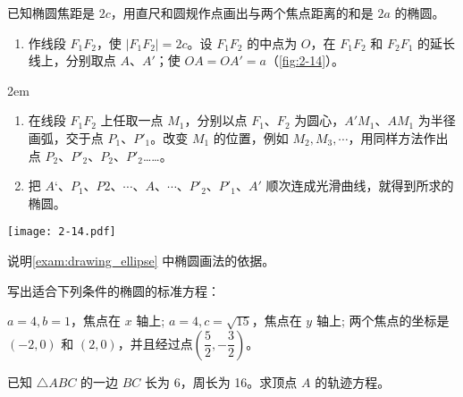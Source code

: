 \begin{example}\label{exam:drawing_ellipse}
  已知椭圆焦距是 $2c$，用直尺和圆规作点画出与两个焦点距离的和是 $2a$ 的椭圆。
\end{example}
\begin{solution}
  \begin{enumerate}
    \item 作线段 $F_1F_2$，使 $|F_1F_2|=2c$。设 $F_1F_2$ 的中点为 $O$，在 $F_1F_2$ 和 $F_2F_1$ 的延长线上，分别取点 $A$、$A'$；使 $OA=OA'=a$（\cref{fig:2-14}）。
  \end{enumerate}

  \medskip\noindent
  \begin{minipage}{0.6\linewidth}\parindent2em
  \begin{enumerate}[resume]
    \item 在线段 $F_1F_2$ 上任取一点 $M_1$，分别以点 $F_1$、$F_2$ 为圆心，$A'M_1$、$AM_1$ 为半径画弧，交于点 $P_1$、$P'_1$。改变 $M_1$ 的位置，例如 $M_2,M_3,\cdots$，用同样方法作出点 $P_2$、$P'_2$、$P_2$、$P'_2$……。
    \item 把 $A‘$、$P_1$、$P2$、$\cdots$、$A$、$\cdots$、$P'_2$、$P'_1$、$A'$ 顺次连成光滑曲线，就得到所求的椭圆。
  \end{enumerate}
\end{minipage}\hfill
  \begin{minipage}{0.35\linewidth}\centering
    \begin{figurehere}
      \texttt{[image: 2-14.pdf]}
      \caption{}\label{fig:2-14}
    \end{figurehere}
  \end{minipage}

\end{solution}
\begin{Practice}
  \begin{question}
    \item 说明\cref{exam:drawing_ellipse} 中椭圆画法的依据。
    \item 写出适合下列条件的椭圆的标准方程：
    \begin{tasks}
      \task $a=4,b=1$，焦点在 $x$ 轴上;
      \task $a=4,c=\sqrt{15}$，焦点在 $y$ 轴上;
      \task 两个焦点的坐标是 $(-2,0)$ 和 $(2,0)$，并且经过点$(\dfrac{5}{2},- \dfrac{3}{2})$。
    \end{tasks}
    \item 已知 $\triangle ABC$ 的一边 $BC$ 长为 6，周长为 16。求顶点 $A$ 的轨迹方程。
  \end{question}
\end{Practice}

